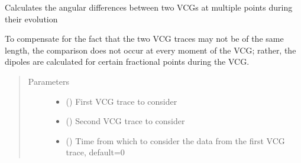 \documentclass[letterpaper,10pt,english]{sphinxmanual}
\begin{document}
\begin{fulllineitems}
\label{\detokenize{_autosummary/signalanalysis.vcg.compare_dipole_angles:signalanalysis.vcg.compare_dipole_angles}}
\sphinxAtStartPar
Calculates the angular differences between two VCGs at multiple points during their evolution

\sphinxAtStartPar
To compensate for the fact that the two VCG traces may not be of the same length, the comparison does not occur
at every moment of the VCG; rather, the dipoles are calculated for certain fractional points during the VCG.
\begin{quote}\begin{description}
\item[{Parameters}] \leavevmode\begin{itemize}
\item {} 
\sphinxAtStartPar
{} () \textendash{} First VCG trace to consider

\item {} 
\sphinxAtStartPar
{} () \textendash{} Second VCG trace to consider

\item {} 
\sphinxAtStartPar
{} (\sphinxstyleliteralemphasis{\sphinxupquote{, }}) \textendash{} Time from which to consider the data from the first VCG trace, default=0


\end{itemize}
\end{description}
\end{quote}
\end{fulllineitems}
\end{document}
